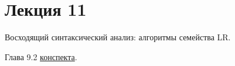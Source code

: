 \section{Лекция 11}
 
Восходящий синтаксический анализ: алгоритмы семейства LR.


Глава 9.2 \href{https://github.com/YaccConstructor/articles/blob/master/InProgress/Formal_langs_CFPQ_course_notes/Formal_lang_CFPQ_course_notes.pdf}{конспекта}.

